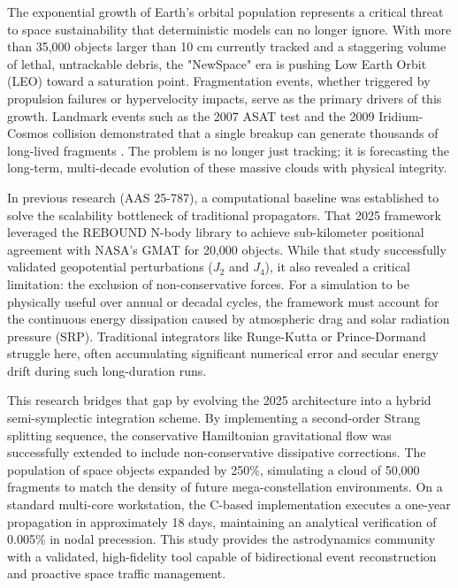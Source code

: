 \documentclass[letterpaper,11pt]{AAS}
\begin{document}
The exponential growth of Earth’s orbital population represents a critical threat to space sustainability that deterministic models can no longer ignore. With more than 35,000 objects larger than 10 cm currently tracked and a staggering volume of lethal, untrackable debris, the "NewSpace" era is pushing Low Earth Orbit (LEO) toward a saturation point\cite{european_space_agency_space_nodate}\cite{diserens_newspace_2020}. Fragmentation events, whether triggered by propulsion failures or hypervelocity impacts, serve as the primary drivers of this growth\cite{kessler_collision_1978}. Landmark events such as the 2007 ASAT test and the 2009 Iridium-Cosmos collision demonstrated that a single breakup can generate thousands of long-lived fragments \cite{wang_analysis_2010}. The problem is no longer just tracking; it is forecasting the long-term, multi-decade evolution of these massive clouds with physical integrity.

In previous research (AAS 25-787), a computational baseline was established to solve the scalability bottleneck of traditional propagators. That 2025 framework leveraged the REBOUND N-body library to achieve sub-kilometer positional agreement with NASA’s GMAT for 20,000 objects\cite{noauthor_general_nodate}. While that study successfully validated geopotential perturbations ($J_2$ and $J_4$), it also revealed a critical limitation: the exclusion of non-conservative forces. For a simulation to be physically useful over annual or decadal cycles, the framework must account for the continuous energy dissipation caused by atmospheric drag and solar radiation pressure (SRP). Traditional integrators like Runge-Kutta or Prince-Dormand struggle here, often accumulating significant numerical error and secular energy drift during such long-duration runs.

This research bridges that gap by evolving the 2025 architecture into a hybrid semi-symplectic integration scheme. By implementing a second-order Strang splitting sequence, the conservative Hamiltonian gravitational flow was successfully extended to include non-conservative dissipative corrections. The population of space objects expanded by 250\%, simulating a cloud of 50,000 fragments to match the density of future mega-constellation environments. On a standard multi-core workstation, the C-based implementation executes a one-year propagation in approximately 18 days, maintaining an analytical verification of 0.005\% in nodal precession. This study provides the astrodynamics community with a validated, high-fidelity tool capable of bidirectional event reconstruction and proactive space traffic management.
\end{document}
